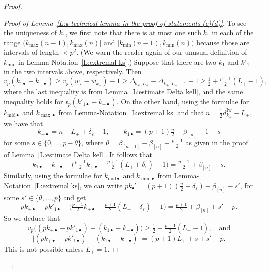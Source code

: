 \documentclass[12pt]{amsart}
\theoremstyle{definition}
\numberwithin{equation}{subsection}
\newcommand{\Iw}{\mathrm{Iw}}
\newcommand{\midd}{\mathrm{mid}}
\begin{document}
\begin{proof}
\begin{proof}[Proof of Lemma~\ref{L:a technical lemma in the proof of statements (c)(d)}]

To see the uniqueness of $k_1$, we first note that there is at most one such $k_1$ in each of the range $\big( k_{\max}(n-1), k_{\max}(n)\big]$ and $ \big[ k_{\min}(n-1), k_{\min}(n)\big)$ because those are intervals of length $< p^2$. (We warn the reader again of our unusual definition of $k_{\min}$ in Lemma-Notation~\ref{L:extremal ks}.) Suppose that there are two $k_1$ and $k'_1$ in the two intervals above, respectively. Then 
\begin{equation}
\label{E:vp of k1-k+}
v_p(k_{1\bullet}-k_{+\bullet}) \geq v_p(w_\star - w_{k_+})-1 \geq \Delta_{k_+, L_+}-\Delta_{k_+, L_+-1}-1 \geq \tfrac 12+ \tfrac {p-1}2(L_+-1),
\end{equation}
where the last inequality is from Lemma~\ref{L:estimate Delta kell}, and the same inequality holds for $v_p(k'_{1\bullet}-k_{+\bullet})$.
On the other hand, using the formulae for $k_{\midd\bullet}$ and $k_{\max\bullet}$ from Lemma-Notation~\ref{L:extremal ks} and that $n = \frac12 d_{k_+}^\Iw-L_+$, we have that
\[
k_{+\bullet}=n+L_++\delta_\varepsilon-1, \qquad k_{1\bullet}= (p+1)\tfrac {n}2 +  \beta_{[n]}-1-s
\]
for some $s \in \{0, \dots, p-\theta\}$,  where $\theta = \beta_{[n-1]}-\beta_{[n]}+\frac{p+1}2$ as given in the proof of Lemma~\ref{L:estimate Delta kell}. 
It follows that
\begin{equation}
\label{E:k1-k+-s}
k_{1\bullet} - k_{+\bullet} - \big(\tfrac{p-1}2k_{+\bullet} - \tfrac{p+1}2 (L_++\delta_\varepsilon)-1\big)  = \tfrac{p+1}2 + \beta_{[n]}-s.
\end{equation}
Similarly, using the formulae for $k_{\midd\bullet}$ and $k_{\min\bullet}$  from Lemma-Notation~\ref{L:extremal ks}, we can write $pk_\bullet'=(p+1)(\frac n2+\delta_{\varepsilon })-\beta_{[n]}-s'$, for some $s'\in \{\theta,\dots, p \}$ and 
get
$$
pk_{+\bullet} -pk'_{1\bullet} -  \big(\tfrac{p-1}2k_{+\bullet} + \tfrac{p+1}2( L_+-\delta_\varepsilon)-1\big) =\tfrac{p+1}2+\beta_{[n]}+s'-p.
$$
So we deduce that
$$
v_p\big( (pk_{+\bullet}-pk'_{1\bullet}) - (k_{1\bullet} - k_{+\bullet})\big)  \geq \tfrac 12 + \tfrac {p-1}2(L_+-1), \quad \textrm{and}
$$
$$
\big|(pk_{+\bullet}-pk'_{1\bullet}) - (k_{1\bullet} - k_{+\bullet})\big| = (p+1)L_+ + s+s'-p.
$$
This is not possible unless $L_+  =1$. 



\end{proof}
\end{proof}
\end{document}
